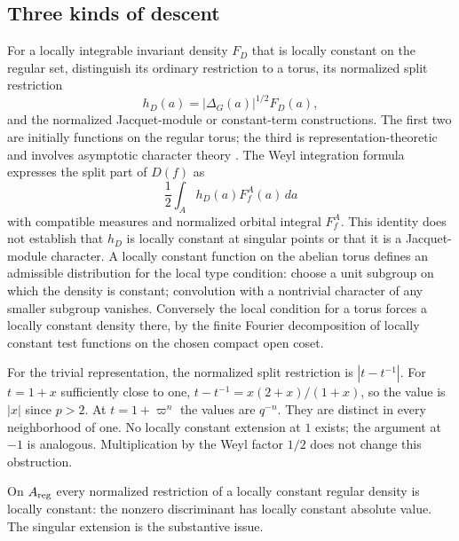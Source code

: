 \subsection{Three kinds of descent}
For a locally integrable invariant density $F_D$ that is locally constant on the regular set, distinguish its ordinary restriction to a torus, its normalized split restriction
\[
h_D(a)=|\Delta_G(a)|^{1/2}F_D(a),
\]
and the normalized Jacquet-module or constant-term constructions. The first two are initially functions on the regular torus; the third is representation-theoretic and involves asymptotic character theory \cite{Ca93,Si79}. The Weyl integration formula expresses the split part of $D(f)$ as
\[
\frac12\int_A h_D(a)F_f^A(a)\,da
\]
with compatible measures and normalized orbital integral $F_f^A$. This identity does not establish that $h_D$ is locally constant at singular points or that it is a Jacquet-module character. A locally constant function on the abelian torus defines an admissible distribution for the local type condition: choose a unit subgroup on which the density is constant; convolution with a nontrivial character of any smaller subgroup vanishes. Conversely the local condition for a torus forces a locally constant density there, by the finite Fourier decomposition of locally constant test functions on the chosen compact open coset.

\begin{example}\label{ex:descent}
For the trivial representation, the normalized split restriction is $|t-t^{-1}|$. For $t=1+x$ sufficiently close to one, $t-t^{-1}=x(2+x)/(1+x)$, so the value is $|x|$ since $p>2$. At $t=1+\varpi^n$ the values are $q^{-n}$. They are distinct in every neighborhood of one. No locally constant extension at $1$ exists; the argument at $-1$ is analogous. Multiplication by the Weyl factor $1/2$ does not change this obstruction.
\end{example}
\begin{center}
\end{center}
On $A_{\rm reg}$ every normalized restriction of a locally constant regular density is locally constant: the nonzero discriminant has locally constant absolute value. The singular extension is the substantive issue.

